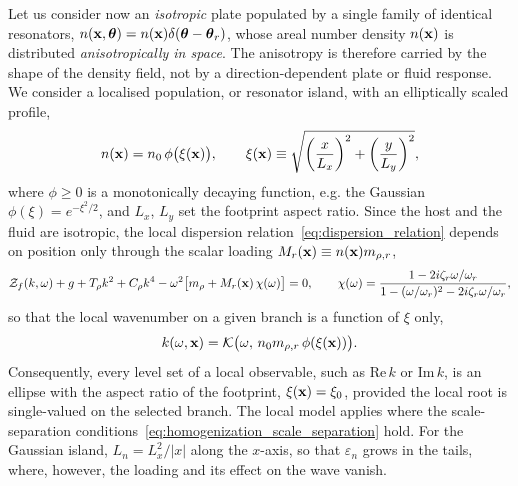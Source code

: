 Let us consider now an \emph{isotropic} plate populated by a single family of identical resonators, $n(\mathbf{x},\boldsymbol{\theta})=n(\mathbf{x})\delta(\boldsymbol{\theta}-\boldsymbol{\theta}_r)$, whose areal number density $n(\mathbf{x})$ is distributed \emph{anisotropically in space}. The anisotropy is therefore carried by the shape of the density field, not by a direction-dependent plate or fluid response. We consider a localised population, or resonator island, with an elliptically scaled profile,
\begin{equation}\label{eq:elliptic_density}
    n(\mathbf{x}) = n_0\,\phi\big(\xi(\mathbf{x})\big), \qquad
    \xi(\mathbf{x}) \equiv \sqrt{\left(\frac{x}{L_x}\right)^2+\left(\frac{y}{L_y}\right)^2},
\end{equation}
where $\phi\ge0$ is a monotonically decaying function, e.g. the Gaussian $\phi(\xi)=e^{-\xi^2/2}$, and $L_x$, $L_y$ set the footprint aspect ratio. Since the host and the fluid are isotropic, the local dispersion relation~\eqref{eq:dispersion_relation} depends on position only through the scalar loading $M_r(\mathbf{x})\equiv n(\mathbf{x})m_{\rho,r}$,
\begin{equation}\label{eq:aniso_density_dispersion}
    \mathcal Z_f(k,\omega) + g + T_\rho k^2 + C_\rho k^4 - \omega^2\big[m_\rho+M_r(\mathbf{x})\,\chi(\omega)\big] = 0, \qquad
    \chi(\omega)=\frac{1-2i\zeta_r\omega/\omega_r}{1-(\omega/\omega_r)^2-2i\zeta_r\omega/\omega_r},
\end{equation}
so that the local wavenumber on a given branch is a function of $\xi$ only,
\begin{equation}\label{eq:k_of_position_general}
    k(\omega,\mathbf{x}) = \mathcal K\big(\omega,\,n_0m_{\rho,r}\,\phi(\xi(\mathbf{x}))\big).
\end{equation}
Consequently, every level set of a local observable, such as $\mathrm{Re}\,k$ or $\mathrm{Im}\,k$, is an ellipse with the aspect ratio of the footprint, $\xi(\mathbf{x})=\xi_0$, provided the local root is single-valued on the selected branch. The local model applies where the scale-separation conditions~\eqref{eq:homogenization_scale_separation} hold. For the Gaussian island, $L_n=L_x^2/|x|$ along the $x$-axis, so that $\varepsilon_n$ grows in the tails, where, however, the loading and its effect on the wave vanish.

